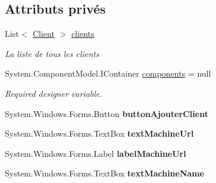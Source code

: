 \subsection*{Attributs privés}
\begin{DoxyCompactItemize}
\item 
List$<$ \mbox{\hyperlink{class_m_t_connect_agent_1_1_model_1_1_client}{Client}} $>$ \mbox{\hyperlink{class_m_t_connect_agent_1_1_form_modifie_machine_a62e4eec844c191c07dde494ceaeed749}{clients}}
\begin{DoxyCompactList}\small\item\em La liste de tous les clients \end{DoxyCompactList}\item 
System.\+Component\+Model.\+I\+Container \mbox{\hyperlink{class_m_t_connect_agent_1_1_form_modifie_machine_a4338fbfc4a2b9f5dd3951a1cf87eeaca}{components}} = null
\begin{DoxyCompactList}\small\item\em Required designer variable. \end{DoxyCompactList}\item 
\mbox{\label{class_m_t_connect_agent_1_1_form_modifie_machine_a31b77659e425ce23a26e24ed395cffac}} 
System.\+Windows.\+Forms.\+Button {\bfseries button\+Ajouter\+Client}
\item 
\mbox{\label{class_m_t_connect_agent_1_1_form_modifie_machine_a14338a8a6226d58b4b74b75a78a81634}} 
System.\+Windows.\+Forms.\+Text\+Box {\bfseries text\+Machine\+Url}
\item 
\mbox{\label{class_m_t_connect_agent_1_1_form_modifie_machine_a934d6cbe52246aa6fe5e40143565f677}} 
System.\+Windows.\+Forms.\+Label {\bfseries label\+Machine\+Url}
\item 
\mbox{\label{class_m_t_connect_agent_1_1_form_modifie_machine_a44f2a8b0e78320ff5bc9dabf810c572e}} 
System.\+Windows.\+Forms.\+Text\+Box {\bfseries text\+Machine\+Name}
\item 
\mbox{\label{class_m_t_connect_agent_1_1_form_modifie_machine_a5dd5828ef0178c40dbd0c74e2a5ec5db}} 

\end{DoxyCompactItemize}
